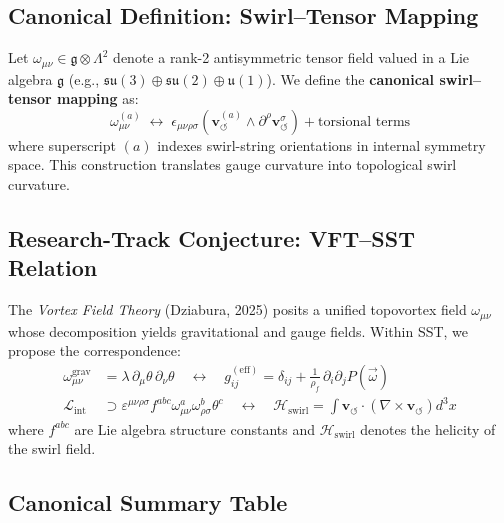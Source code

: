 \documentclass[10pt,reprint,aps,onecolumn,nofootinbib]{revtex4-2}
\begin{document}
    \subsection*{Canonical Definition: Swirl–Tensor Mapping}

        Let $\omega_{\mu\nu} \in \mathfrak{g} \otimes \Lambda^2$ denote a rank-2 antisymmetric tensor field valued in a Lie algebra $\mathfrak{g}$ (e.g., $\mathfrak{su}(3) \oplus \mathfrak{su}(2) \oplus \mathfrak{u}(1)$). We define the \textbf{canonical swirl–tensor mapping} as:
        \begin{equation}
        \omega_{\mu\nu}^{(a)} \;\longleftrightarrow\; \epsilon_{\mu\nu\rho\sigma} \left( \mathbf{v}_{\!\boldsymbol{\circlearrowleft}}^{(a)} \wedge \partial^\rho \mathbf{v}^{\sigma}_{\!\boldsymbol{\circlearrowleft}} \right) + \text{torsional terms}
        \end{equation}
        where superscript $(a)$ indexes swirl-string orientations in internal symmetry space. This construction translates gauge curvature into topological swirl curvature.

    \subsection*{Research-Track Conjecture: VFT–SST Relation}

        The \textit{Vortex Field Theory} (Dziabura, 2025) posits a unified topovortex field $\omega_{\mu\nu}$ whose decomposition yields gravitational and gauge fields. Within SST, we propose the correspondence:
        \begin{align}
        \omega_{\mu\nu}^{\text{grav}} &= \lambda\, \partial_\mu \theta \, \partial_\nu \theta \quad \longleftrightarrow \quad
        g_{ij}^{(\text{eff})} = \delta_{ij} + \frac{1}{\rho_{\!f}} \, \partial_i \partial_j P(\vec{\omega}) \\
        \mathcal{L}_{\text{int}} &\supset \varepsilon^{\mu\nu\rho\sigma} f^{abc} \omega^a_{\mu\nu} \omega^b_{\rho\sigma} \theta^c \quad \longleftrightarrow \quad \mathcal{H}_{\text{swirl}} = \int \mathbf{v}_{\!\boldsymbol{\circlearrowleft}} \cdot \left( \nabla \times \mathbf{v}_{\!\boldsymbol{\circlearrowleft}} \right) d^3x
        \end{align}
        where $f^{abc}$ are Lie algebra structure constants and $\mathcal{H}_{\text{swirl}}$ denotes the helicity of the swirl field.

    \subsection*{Canonical Summary Table}
\end{document}
